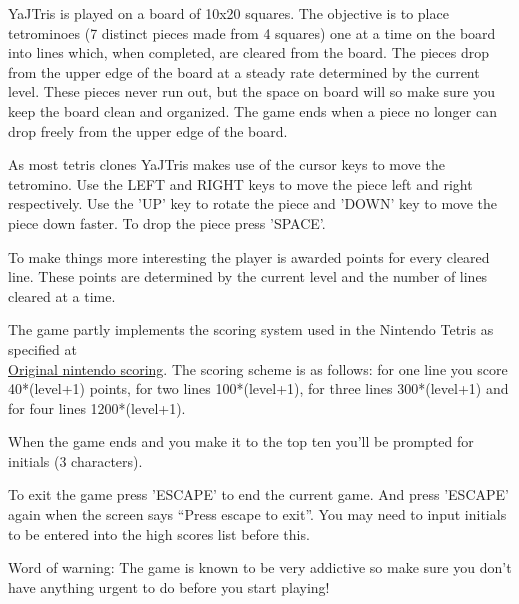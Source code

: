 YaJTris is played on a board of 10x20 squares. The objective is to place tetrominoes
(7 distinct pieces made from 4 squares) one at a time on the board into lines which, when completed, are
cleared from the board. The pieces drop from the upper edge of the board at a steady rate determined by the current level.
These pieces never run out, but the space on board will so make sure you keep the board clean and organized.
The game ends when a piece no longer can drop freely from the upper edge of the board.

As most tetris clones YaJTris makes use of the cursor keys to move the tetromino. Use
the LEFT and RIGHT keys to move the piece left and right respectively. Use the 'UP' key to
rotate the piece and 'DOWN' key to move the piece down faster. To drop the piece press 'SPACE'.

To make things more interesting the player is awarded points for every cleared line. These points
are determined by the current level and the number of lines cleared at a time.

The game partly implements the scoring system used in the Nintendo Tetris as specified at \\
\href{http://www.tetrisconcept.com/wiki/index.php?title=Scoring\#Original_Nintendo_scoring_system}{Original nintendo scoring}.
The scoring scheme is as follows: for one line you score 40*(level+1) points, for two lines 100*(level+1), for three lines 300*(level+1) and
for four lines 1200*(level+1).

When the game ends and you make it to the top ten you'll be prompted for initials (3 characters).

To exit the game press 'ESCAPE' to end the current game. And press 'ESCAPE' again
when the screen says ``Press escape to exit''. You may need to input initials
to be entered into the high scores list before this.

Word of warning: The game is known to be very addictive so make sure you don't have anything urgent to do before
you start playing!

